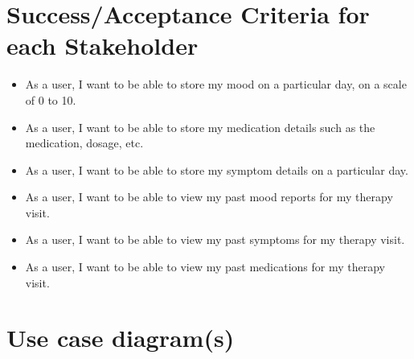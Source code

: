 \documentclass[11pt]{article}
\begin{document}
    \pagebreak


    \section{Success/Acceptance Criteria for each Stakeholder}\label{sec:success/acceptance-criteria-for-each-stakeholder}


    \begin{itemize}
        \item As a user, I want to be able to store my mood on a particular day, on a scale of 0 to 10.
        \item As a user, I want to be able to store my medication details such as the medication, dosage, etc.
        \item As a user, I want to be able to store my symptom details on a particular day.
        \item As a user, I want to be able to view my past mood reports for my therapy visit.
        \item As a user, I want to be able to view my past symptoms for my therapy visit.
        \item As a user, I want to be able to view my past medications for my therapy visit.
    \end{itemize}

    \pagebreak


    \section{Use case diagram(s)}\label{sec:use-case-diagram(s)}
\end{document}
